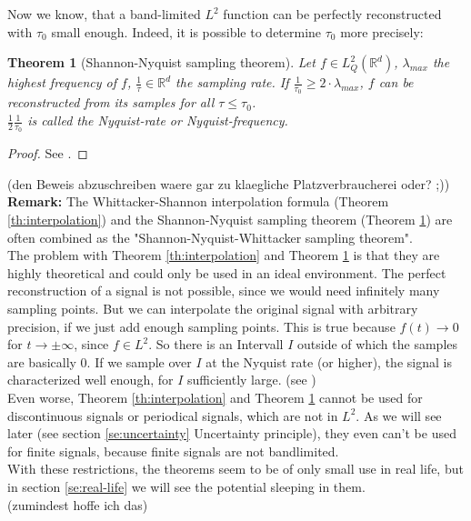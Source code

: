 \documentclass[a4paper, 11pt]{scrreprt}
\newtheorem{theorem}[defi]{Theorem}
\newcommand{\RR}{\mathbb{R}}
\begin{document}
Now we know, that a band-limited \(L^2\) function can be perfectly reconstructed with \(\tau_0\) small enough. Indeed, it is possible to determine \(\tau_0\) more precisely:
\begin{theorem}[Shannon-Nyquist sampling theorem]
\label{th:sampling}
Let \(f\in L^2_Q(\RR^d)\), \(\lambda_{max}\) the highest frequency of \(f\), \(\frac{1}{\tau}\in \RR^d\) the sampling rate. If \(\frac{1}{\tau_0} \geq 2\cdot \lambda_{max}\), \(f\) can be reconstructed from its samples for all \(\tau \leq \tau_0\).\\
\(\frac 1 2 \frac{1}{\tau_0}\) is called the Nyquist-rate or Nyquist-frequency.
\end{theorem} 
\begin{proof}
See \cite{shannon01}.
\end{proof}
(den Beweis abzuschreiben waere gar zu klaegliche Platzverbraucherei oder? ;))\\
\textbf{Remark:} The Whittacker-Shannon interpolation formula (Theorem  \ref{th:interpolation}) and the Shannon-Nyquist sampling theorem (Theorem \ref{th:sampling}) are often combined as the "Shannon-Nyquist-Whittacker sampling theorem".\\
The problem with Theorem  \ref{th:interpolation} and Theorem \ref{th:sampling} is that they are highly theoretical and could only be used in an ideal environment. The perfect reconstruction of a signal is not possible, since we would need infinitely many sampling points. But we can interpolate the original signal with arbitrary precision, if we just add enough sampling points. This is true because \(f(t)\to 0\) for \(t\to\pm\infty\), since \(f\in L^2\). So there is an Intervall \(I\) outside of which the samples are basically 0. If we sample over \(I\) at the Nyquist rate (or higher), the signal is characterized well enough, for \(I\) sufficiently large. (see \cite{marks02})\\
Even worse, Theorem  \ref{th:interpolation} and Theorem \ref{th:sampling} cannot be used for discontinuous signals or periodical signals, which are not in \(L^2\). As we will see later (see section \ref{se:uncertainty} Uncertainty principle), they even can't be used for finite signals, because finite signals are not bandlimited. \\
With these restrictions, the theorems seem to be of only small use in real life, but in section \ref{se:real-life} we will see the potential sleeping in them.\\
(zumindest hoffe ich das)
\end{document}
